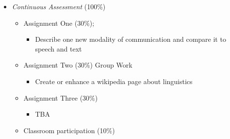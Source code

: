 \documentclass[a4paper,landscape,headrule,footrule,xetex]{foils}
\begin{document}
\begin{itemize} 
\item \textit{Continuous Assessment} (100\%)
\begin{itemize}
\item Assignment One (30\%); 
  \begin{itemize}
  \item Describe one new modality of communication and compare it to
    speech and text 
  \end{itemize}
\item Assignment Two (30\%) Group Work
  \begin{itemize}
  \item Create or enhance a wikipedia page about linguistics
  \end{itemize}
\item Assignment Three (30\%)
  \begin{itemize}
  \item TBA
  \end{itemize}
\item Classroom participation  (10\%)
\end{itemize}
\end{itemize}


\end{document}
